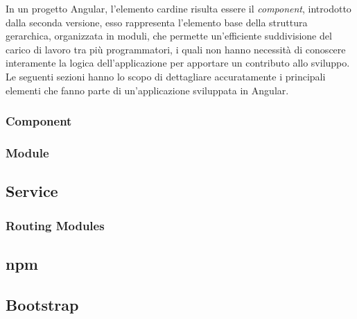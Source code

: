 In un progetto Angular, l'elemento cardine risulta essere il \textit{component}, introdotto dalla seconda versione, esso rappresenta l'elemento base della struttura gerarchica, organizzata in moduli, che permette un'efficiente suddivisione del carico di lavoro tra più programmatori, i quali non hanno necessità di conoscere interamente la logica dell'applicazione per apportare un contributo allo sviluppo.
Le seguenti sezioni hanno lo scopo di dettagliare accuratamente i principali elementi che fanno parte di un'applicazione sviluppata in Angular.

\subsubsection{Component}

\subsubsection{Module}

\subsection{Service}

\subsubsection{Routing Modules}

\subsection{npm}

\subsection{Bootstrap}
